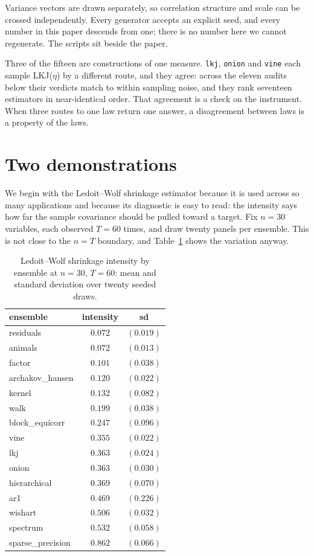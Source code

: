 \documentclass[11pt]{article}
\begin{document}
Variance vectors are drawn separately, so correlation structure and scale
can be crossed independently. Every generator accepts an explicit seed,
and every number in this paper descends from one; there is no number
here we cannot regenerate. The scripts sit beside the paper.

Three of the fifteen are constructions of one measure. \texttt{lkj},
\texttt{onion} and \texttt{vine} each sample LKJ($\eta$) by a different
route, and they agree: across the eleven audits below their verdicts match
to within sampling noise, and they rank seventeen estimators in
near-identical order. That agreement is a check on the instrument. When
three routes to one law return one answer, a disagreement between laws is
a property of the laws.

\section{Two demonstrations}\label{sec:lw-demo}

We begin with the Ledoit--Wolf shrinkage estimator because it is used
across so many applications and because its diagnostic is easy to read:
the intensity says how far the sample covariance should be pulled toward
a target. Fix $n=30$ variables, each observed $T=60$ times, and draw
twenty panels per ensemble. This is not close to the $n=T$ boundary, and
Table~\ref{tab:lw} shows the variation anyway.

\begin{table}[t]
\centering\small
\begin{tabular}{lcc}
\toprule
ensemble & intensity & sd \\
\midrule
residuals & $0.072$ & $(0.019)$ \\
animals & $0.072$ & $(0.013)$ \\
factor & $0.101$ & $(0.038)$ \\
archakov\_hansen & $0.120$ & $(0.022)$ \\
kernel & $0.132$ & $(0.082)$ \\
walk & $0.199$ & $(0.038)$ \\
block\_equicorr & $0.247$ & $(0.096)$ \\
vine & $0.355$ & $(0.022)$ \\
lkj & $0.363$ & $(0.024)$ \\
onion & $0.363$ & $(0.030)$ \\
hierarchical & $0.369$ & $(0.070)$ \\
ar1 & $0.469$ & $(0.226)$ \\
wishart & $0.506$ & $(0.032)$ \\
spectrum & $0.532$ & $(0.058)$ \\
sparse\_precision & $0.862$ & $(0.066)$ \\
\bottomrule
\end{tabular}
\caption{Ledoit--Wolf shrinkage intensity by ensemble at $n=30$, $T=60$:
mean and standard deviation over twenty seeded draws.}\label{tab:lw}
\end{table}
\end{document}
